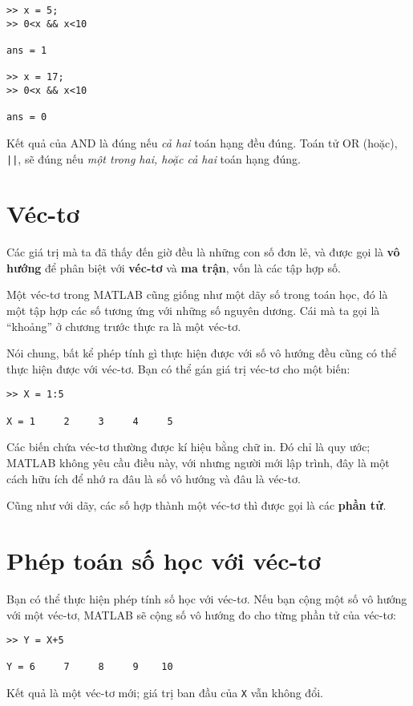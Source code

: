 \documentclass[12pt]{book}
\begin{document}
\begin{verbatim}
>> x = 5;
>> 0<x && x<10

ans = 1

>> x = 17;
>> 0<x && x<10

ans = 0
\end{verbatim}
%
Kết quả của AND là đúng nếu {\em cả hai} toán hạng đều đúng.
Toán tử OR (hoặc), {\tt ||}, sẽ đúng nếu 
{\em một trong hai, hoặc cả hai} toán hạng đúng.


\section{Véc-tơ}

Các giá trị mà ta đã thấy đến giờ đều là những con số đơn lẻ,
và được gọi là {\bf vô hướng} để phân biệt với {\bf véc-tơ}
và {\bf ma trận}, vốn là các tập hợp số.

Một véc-tơ trong MATLAB cũng giống như một dãy số trong
toán học, đó là một tập hợp các số tương ứng với những số
nguyên dương. Cái mà ta gọi là ``khoảng'' ở chương trước
thực ra là một véc-tơ.

Nói chung, bất kể phép tính gì thực hiện được với số vô hướng
đều cũng có thể thực hiện được với véc-tơ. Bạn có thể gán
giá trị véc-tơ cho một biến:

\begin{verbatim}
>> X = 1:5

X = 1     2     3     4     5
\end{verbatim}
%
Các biến chứa véc-tơ thường được kí hiệu bằng chữ in. Đó 
chỉ là quy ước; MATLAB không yêu cầu điều này, với nhưng người
mới lập trình, đây là một cách hữu ích để nhớ ra đâu là số vô hướng
và đâu là véc-tơ.

Cũng như với dãy, các số hợp thành một véc-tơ thì được gọi là các
{\bf phần tử}.


\section{Phép toán số học với véc-tơ}

Bạn có thể thực hiện phép tính số học với véc-tơ. Nếu bạn cộng
một số vô hướng với một véc-tơ, MATLAB sẽ cộng số vô hướng
đo cho từng phần tử của véc-tơ:

\begin{verbatim}
>> Y = X+5

Y = 6     7     8     9    10
\end{verbatim}
%
Kết quả là một véc-tơ mới; giá trị ban đầu của {\tt X} vẫn
không đổi.
\end{document}
